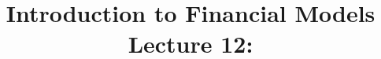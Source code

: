 \documentclass[10pt]{beamer}
\title{Introduction to Financial Models\\Lecture 12: }
\author{}
\date{}
\begin{document}
\begin{frame}
\titlepage
\end{frame}


%  
%  
\end{document}
